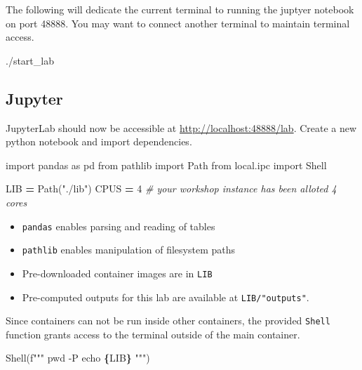 \documentclass[
]{book}
\newenvironment{Shaded}{\begin{snugshade}}{\end{snugshade}}
\newcommand{\CommentTok}[1]{\textcolor[rgb]{0.56,0.35,0.01}{\textit{#1}}}
\newcommand{\DecValTok}[1]{\textcolor[rgb]{0.00,0.00,0.81}{#1}}
\newcommand{\ExtensionTok}[1]{#1}
\newcommand{\ImportTok}[1]{#1}
\newcommand{\NormalTok}[1]{#1}
\newcommand{\OperatorTok}[1]{\textcolor[rgb]{0.81,0.36,0.00}{\textbf{#1}}}
\newcommand{\SpecialCharTok}[1]{\textcolor[rgb]{0.81,0.36,0.00}{\textbf{#1}}}
\newcommand{\SpecialStringTok}[1]{\textcolor[rgb]{0.31,0.60,0.02}{#1}}
\newcommand{\StringTok}[1]{\textcolor[rgb]{0.31,0.60,0.02}{#1}}
\providecommand{\tightlist}{%
  \setlength{\itemsep}{0pt}\setlength{\parskip}{0pt}}
\begin{document}
The following will dedicate the current terminal to running the juptyer notebook on port 48888.
You may want to connect another terminal to maintain terminal access.

\begin{Shaded}
\begin{Highlighting}[]
\ExtensionTok{./start\_lab}
\end{Highlighting}
\end{Shaded}

\subsection{Jupyter}\label{jupyter}

JupyterLab should now be accessible at \url{http://localhost:48888/lab}. Create a new python notebook and import dependencies.

\begin{Shaded}
\begin{Highlighting}[numbers=left,,]
\ImportTok{import}\NormalTok{ pandas }\ImportTok{as}\NormalTok{ pd}
\ImportTok{from}\NormalTok{ pathlib }\ImportTok{import}\NormalTok{ Path}
\ImportTok{from}\NormalTok{ local.ipc }\ImportTok{import}\NormalTok{ Shell}

\NormalTok{LIB }\OperatorTok{=}\NormalTok{ Path(}\StringTok{"./lib"}\NormalTok{)}
\NormalTok{CPUS }\OperatorTok{=} \DecValTok{4} \CommentTok{\# your workshop instance has been alloted 4 cores}
\end{Highlighting}
\end{Shaded}

\begin{itemize}
\tightlist
\item
  \texttt{pandas} enables parsing and reading of tables
\item
  \texttt{pathlib} enables manipulation of filesystem paths
\item
  Pre-downloaded container images are in \texttt{LIB}
\item
  Pre-computed outputs for this lab are available at \texttt{LIB/"outputs"}.
\end{itemize}

Since containers can not be run inside other containers,
the provided \texttt{Shell} function grants access to the terminal outside of the main container.

\begin{Shaded}
\begin{Highlighting}[numbers=left,,]
\NormalTok{Shell(}\SpecialStringTok{f"""}
\SpecialStringTok{pwd {-}P}
\SpecialStringTok{echo }\SpecialCharTok{\{}\NormalTok{LIB}\SpecialCharTok{\}}
\SpecialStringTok{"""}\NormalTok{)}
\end{Highlighting}
\end{Shaded}
\end{document}

